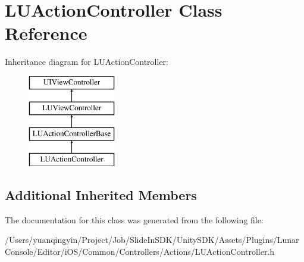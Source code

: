 \hypertarget{interface_l_u_action_controller}{}\section{L\+U\+Action\+Controller Class Reference}
\label{interface_l_u_action_controller}
Inheritance diagram for L\+U\+Action\+Controller\+:\begin{figure}[H]
\begin{center}
\leavevmode
\includegraphics[height=4.000000cm]{interface_l_u_action_controller}
\end{center}
\end{figure}
\subsection*{Additional Inherited Members}


The documentation for this class was generated from the following file\+:\begin{DoxyCompactItemize}
\item 
/\+Users/yuanqingyin/\+Project/\+Job/\+Slide\+In\+S\+D\+K/\+Unity\+S\+D\+K/\+Assets/\+Plugins/\+Lunar\+Console/\+Editor/i\+O\+S/\+Common/\+Controllers/\+Actions/L\+U\+Action\+Controller.\+h\end{DoxyCompactItemize}
